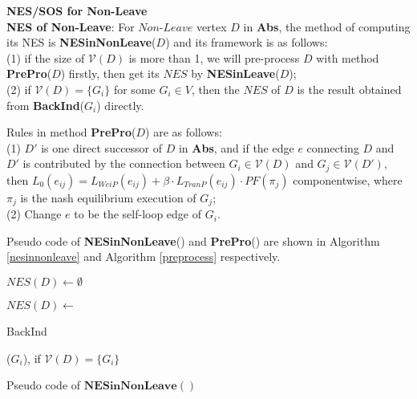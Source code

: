 \documentclass{acm_proc_article-sp}
\begin{document}
\textbf{NES/SOS for Non-Leave}\\
\textbf{NES of Non-Leave}: For $\textit{Non-Leave}$ vertex $D$ in \textbf{Abs}, the method of computing its NES is \textbf{NESinNonLeave}($D$) and its framework is as follows:\\
(1) if the size of $\mathcal{V}(D)$ is more than 1, we will pre-process $D$ with method \textbf{PrePro}($D$) firstly, then get its $\textit{NES}$ by \textbf{NESinLeave}($D$);\\
(2) if $\mathcal{V}(D)=\{G_{\textit{i}}\}$ for some $G_{\textit{i}}\in V$, then the $\textit{NES}$ of $D$ is the result obtained from \textbf{BackInd}($G_{\textit{i}}$) directly.

Rules in method \textbf{PrePro}($D$) are as follows:\\
(1) $D'$ is one direct successor of $D$ in \textbf{Abs}, and if the edge $e$ connecting $D$ and $D'$ is contributed by the connection between $G_{\textit{i}}\in \mathcal{V}(D)$ and $G_{\textit{j}}\in \mathcal{V}(D')$, then $L_{0}(e_{\textit{ij}})=L_{\textit{WeiP}}(e_{\textit{ij}})+\beta\cdot L_{\textit{TranP}}(e_{\textit{ij}})\cdot PF(\pi_{\textit{j}})$ componentwise, where $\pi_{\textit{j}}$ is the nash equilibrium execution of $G_{\textit{j}}$;\\
(2) Change $e$ to be the self-loop edge of $G_{\textit{i}}$.

Pseudo code of \textbf{NESinNonLeave}() and \textbf{PrePro}() are shown in Algorithm \ref{nesinnonleave} and Algorithm \ref{preprocess} respectively.
\begin{algorithm}[!h]
\scriptsize
 $\textit{NES}(D)\leftarrow \emptyset$\;
 {
 $\textit{NES}(D)\leftarrow $\begin{bf}BackInd\end{bf}($G_{\textit{i}}$), if $\mathcal{V}(D)=\{G_{\textit{i}}\}$\;
 }
 \caption{Pseudo code of $\mathbf{NESinNonLeave}()$}
 \label{nesinnonleave}
\end{algorithm}
\end{document}
